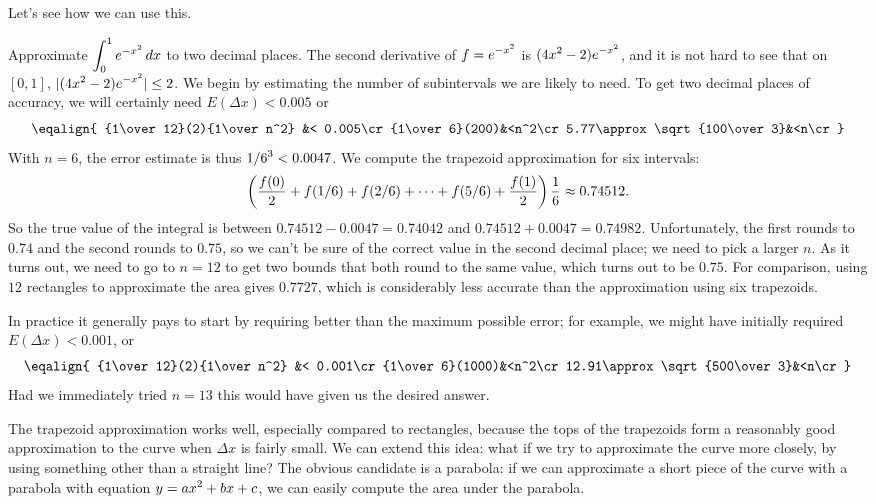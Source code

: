 Let's see how we can use this. 

\example Approximate $\displaystyle\int_0^1 e^{-x^2}\,dx$ to two decimal places.
The second derivative of $\displaystyle f=e^{-x^2}$ is $\displaystyle(4x^2-2)e^{-x^2}$, and
it is not hard to see that on $[0,1]$, $\displaystyle|(4x^2-2)e^{-x^2}|\le 2$.
We begin by estimating the number of subintervals we are likely to
need. To get two decimal places of accuracy, we will certainly need
$E(\Delta x)<0.005$ or
$$
  \eqalign{
  {1\over12}(2){1\over n^2} &< 0.005\cr
  {1\over6}(200)&<n^2\cr
  5.77\approx\sqrt{100\over3}&<n\cr}
$$
With $n=6$, the error estimate is thus $\displaystyle1/6^3<0.0047$.
We compute the trapezoid approximation for six intervals:
$$
  \left({f(0)\over2}+f(1/6)+f(2/6)+\cdots+f(5/6)+{f(1)\over2}\right){1\over6}
  \approx 0.74512.
$$
So the true value of the integral is between $0.74512-0.0047=0.74042$ and
$0.74512+0.0047=0.74982$. Unfortunately, the first rounds to $0.74$
and the second 
rounds to $0.75$, so we can't be sure of the correct value in
the second decimal place; we need to pick a larger $n$.
As it turns out, we need to go to $n=12$ to get two bounds that both
round to the same value, which turns out to be $0.75$. For comparison,
using $12$ rectangles to approximate the area gives $0.7727$, which is
considerably less accurate than the approximation using six trapezoids.

In practice it
generally pays to start by requiring better than the maximum possible
error; for example, we might have initially required $E(\Delta
x)<0.001$, or 
$$
  \eqalign{
  {1\over12}(2){1\over n^2} &< 0.001\cr
  {1\over6}(1000)&<n^2\cr
  12.91\approx\sqrt{500\over3}&<n\cr}
$$
Had we immediately tried $n=13$ this would have given us the desired
answer. 
\endexample

The trapezoid approximation works well, especially compared to
rectangles, because the tops of the trapezoids form a reasonably good
approximation to the curve when $\Delta x$ is fairly small. We can
extend this idea: what if we try to approximate the curve more
closely, by using something other than a straight line? The obvious
candidate is a parabola: if we can approximate a short piece of the
curve with a parabola with equation $\displaystyle y=ax^2+bx+c$, we can easily
compute the area under the parabola.

